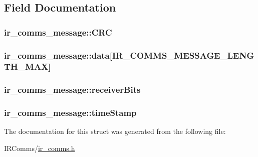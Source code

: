 \subsection{Field Documentation}
\hypertarget{structir__comms__message_aad085bc20d31ef89fc42943b748b917e}{
\subsubsection[{CRC}]{ {\bf ir\_\-comms\_\-message::CRC}}}
\label{structir__comms__message_aad085bc20d31ef89fc42943b748b917e}
\hypertarget{structir__comms__message_a3642527908fa71e0774115dc4250a720}{
\subsubsection[{data}]{ {\bf ir\_\-comms\_\-message::data}\mbox{[}IR\_\-COMMS\_\-MESSAGE\_\-LENGTH\_\-MAX\mbox{]}}}
\label{structir__comms__message_a3642527908fa71e0774115dc4250a720}
\hypertarget{structir__comms__message_a7e633bbef09d0ef2d7095120ffa8f037}{
\subsubsection[{receiverBits}]{ {\bf ir\_\-comms\_\-message::receiverBits}}}
\label{structir__comms__message_a7e633bbef09d0ef2d7095120ffa8f037}
\hypertarget{structir__comms__message_a31a6fb7e84ba1a5614a08e128a487d91}{
\subsubsection[{timeStamp}]{ {\bf ir\_\-comms\_\-message::timeStamp}}}
\label{structir__comms__message_a31a6fb7e84ba1a5614a08e128a487d91}


The documentation for this struct was generated from the following file:\begin{DoxyCompactItemize}
\item 
IRComms/\hyperlink{ir__comms_8h}{ir\_\-comms.h}\end{DoxyCompactItemize}
